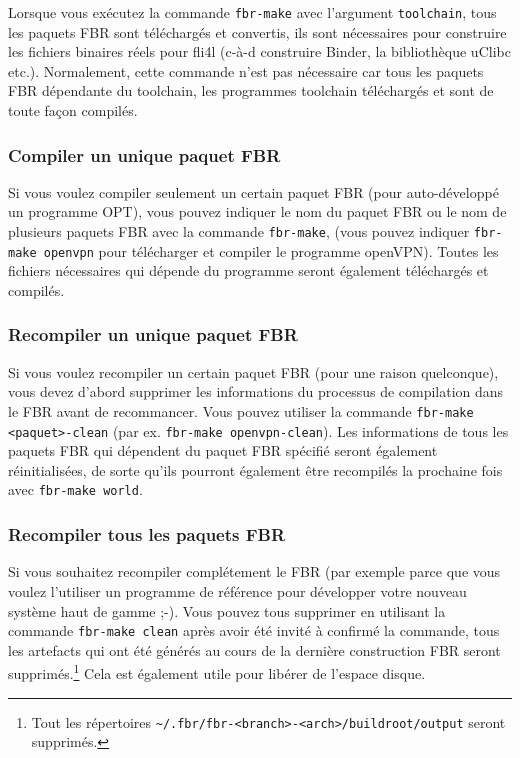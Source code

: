 Lorsque vous exécutez la commande \texttt{fbr-make} avec l'argument \texttt{toolchain},
tous les paquets FBR sont téléchargés et convertis, ils sont nécessaires pour
construire les fichiers binaires réels pour fli4l (c-à-d construire Binder,
la bibliothèque uClibc etc.). Normalement, cette commande n'est pas nécessaire
car tous les paquets FBR dépendante du toolchain, les programmes toolchain
téléchargés et sont de toute façon compilés.

\subsubsection{Compiler un unique paquet FBR}

Si vous voulez compiler seulement un certain paquet FBR (pour auto-développé un
programme OPT), vous pouvez indiquer le nom du paquet FBR ou le nom de plusieurs
paquets FBR avec la commande \texttt{fbr-make}, (vous pouvez indiquer
\texttt{fbr-make openvpn} pour télécharger et compiler le programme openVPN).
Toutes les fichiers nécessaires qui dépende du programme seront également
téléchargés et compilés.

\subsubsection{Recompiler un unique paquet FBR }

Si vous voulez recompiler un certain paquet FBR (pour une raison quelconque),
vous devez d'abord supprimer les informations du processus de compilation dans
le FBR avant de recommancer. Vous pouvez utiliser la commande \texttt{fbr-make <paquet>-clean}
(par ex. \texttt{fbr-make openvpn-clean}). Les informations de tous les paquets
FBR qui dépendent du paquet FBR spécifié seront également réinitialisées, de sorte
qu'ils pourront également être recompilés la prochaine fois avec \texttt{fbr-make world}.

\subsubsection{Recompiler tous les paquets FBR}

Si vous souhaitez recompiler complétement le FBR (par exemple parce que vous
voulez l'utiliser un programme de référence pour développer votre nouveau système
haut de gamme ;-). Vous pouvez tous supprimer en utilisant la commande
\texttt{fbr-make clean} après avoir été invité à confirmé la commande, tous
les artefacts qui ont été générés au cours de la dernière construction FBR seront
supprimés.\footnote{Tout les répertoires \texttt{\~{}/.fbr/fbr-<branch>-<arch>/buildroot/output}
seront supprimés.} Cela est également utile pour libérer de l'espace disque.

